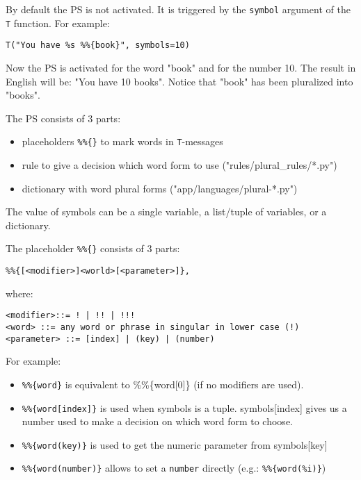 \documentclass[justified,sixbynine,notoc]{tufte-book}
\def\ft{\small\tt}
\begin{document}
\begin{fullwidth}
By default the PS is not activated. It is triggered by the {\ft symbol} argument of the {\ft T} function. For example:

\begin{lstlisting}
T("You have %s %%{book}", symbols=10)
\end{lstlisting}

Now the PS is activated for the word "book" and for the number 10.
The result in English will be: "You have 10 books". Notice that "book" has been pluralized into "books".

The PS consists of 3 parts:
\begin{itemize}
\item placeholders {\ft \%\%\{\}} to mark words in {\ft T}-messages

\item rule to give a decision which word form to use ("rules/plural\_rules/*.py")

\item dictionary with word plural forms ("app/languages/plural-*.py")
\end{itemize}

The value of symbols can be a single variable, a list/tuple of variables, or a dictionary.

The placeholder {\ft \%\%\{\}} consists of 3 parts:

\begin{lstlisting}
%%{[<modifier>]<world>[<parameter>]},
\end{lstlisting}
\noindent where:

\begin{lstlisting}[keywords={}]
<modifier>::= ! | !! | !!!
<word> ::= any word or phrase in singular in lower case (!)
<parameter> ::= [index] | (key) | (number)
\end{lstlisting}

For example:

\begin{itemize}
\item {\ft \%\%\{word\}} is equivalent to \%\%\{word[0]\} (if no modifiers are used).

\item {\ft \%\%\{word[index]\}} is used when symbols is a tuple. symbols[index] gives us a number used to make a decision on which word form to choose.

\item {\ft \%\%\{word(key)\}} is used to get the numeric parameter from symbols[key]

\item {\ft \%\%\{word(number)\}} allows to set a {\ft number} directly (e.g.: {\ft \%\%\{word(\%i)\}})


\end{itemize}
\end{fullwidth}
\end{document}
